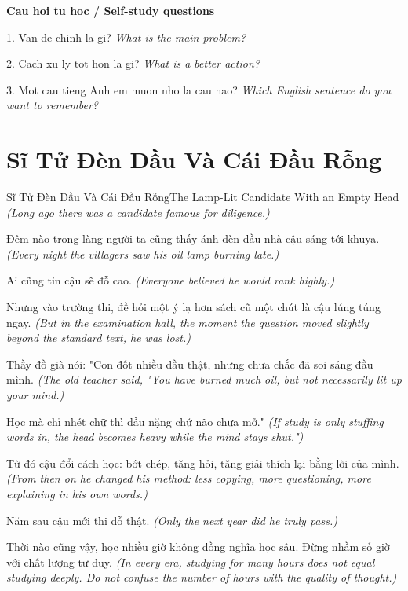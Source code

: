\begin{tuhocnhanh}
\textbf{Cau hoi tu hoc / Self-study questions}

1. Van de chinh la gi? \textit{What is the main problem?}

2. Cach xu ly tot hon la gi? \textit{What is a better action?}

3. Mot cau tieng Anh em muon nho la cau nao? \textit{Which English sentence do you want to remember?}
\end{tuhocnhanh}
\ngancach

\section{Sĩ Tử Đèn Dầu Và Cái Đầu Rỗng}
\begin{truyen}{Sĩ Tử Đèn Dầu Và Cái Đầu Rỗng}{The Lamp-Lit Candidate With an Empty Head}
\textit{(Long ago there was a candidate famous for diligence.)}

Đêm nào trong làng người ta cũng thấy ánh đèn dầu nhà cậu sáng tới khuya.
\textit{(Every night the villagers saw his oil lamp burning late.)}

Ai cũng tin cậu sẽ đỗ cao.
\textit{(Everyone believed he would rank highly.)}

Nhưng vào trường thi, đề hỏi một ý lạ hơn sách cũ một chút là cậu lúng túng ngay.
\textit{(But in the examination hall, the moment the question moved slightly beyond the standard text, he was lost.)}

Thầy đồ già nói: "Con đốt nhiều dầu thật, nhưng chưa chắc đã soi sáng đầu mình.
\textit{(The old teacher said, "You have burned much oil, but not necessarily lit up your mind.)}

Học mà chỉ nhét chữ thì đầu nặng chứ não chưa mở."
\textit{(If study is only stuffing words in, the head becomes heavy while the mind stays shut.")}

Từ đó cậu đổi cách học: bớt chép, tăng hỏi, tăng giải thích lại bằng lời của mình.
\textit{(From then on he changed his method: less copying, more questioning, more explaining in his own words.)}

Năm sau cậu mới thi đỗ thật.
\textit{(Only the next year did he truly pass.)}

\end{truyen}

\begin{baihoc}
Thời nào cũng vậy, học nhiều giờ không đồng nghĩa học sâu. Đừng nhầm số giờ với chất lượng tư duy.
\textit{(In every era, studying for many hours does not equal studying deeply. Do not confuse the number of hours with the quality of thought.)}
\end{baihoc}

